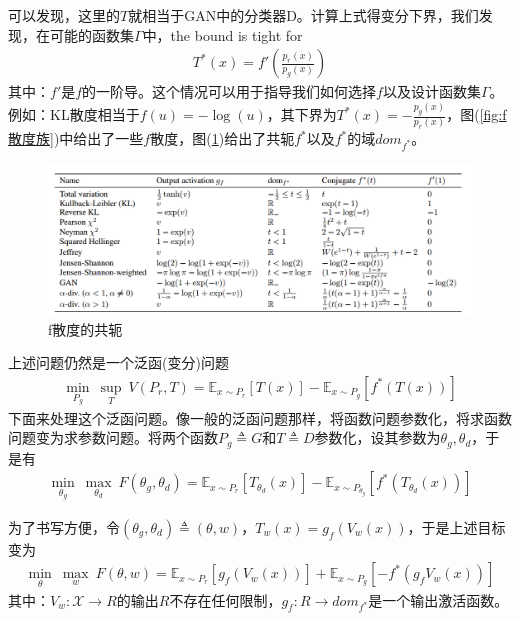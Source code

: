             \par
            可以发现，这里的$T$就相当于GAN中的分类器D。计算上式得变分下界，我们发现，在可能的函数集$\Gamma$中，the bound is tight for
            \begin{align*}
            T^*(x) = f' \left( \frac{p_r(x)}{p_g(x)} \right)
            \end{align*}
            其中：$f'$是$f$的一阶导。这个情况可以用于指导我们如何选择$f$以及设计函数集$\Gamma$。例如：KL散度相当于$f(u) = -\log (u)$，其下界为$T^*(x) = -\frac{p_g(x)}{p_r(x)}$，图(\ref{fig:f散度族})中给出了一些$f$散度，图(\ref{fig:f散度的共轭})给出了共轭$f^*$以及$f^*$的域$dom_{f^*}$。
                \begin{figure}[H]
                \centering
                \includegraphics[width=12cm]{images/fsandu.jpg}
                \caption{f散度的共轭}
                \label{fig:f散度的共轭}
                \end{figure}
            \par
            上述问题仍然是一个泛函(变分)问题
            \begin{align*}
            \min_{P_g} \ \sup_{T}\ V(P_r,T) = \mathbb{E}_{x\sim P_r}[T(x)] - \mathbb{E}_{x\sim P_g}[f^*(T(x))]
            \end{align*}
            下面来处理这个泛函问题。像一般的泛函问题那样，将函数问题参数化，将求函数问题变为求参数问题。将两个函数$P_g \triangleq G $和$T\triangleq D$参数化，设其参数为$\theta_g,\theta_d$，于是有
            \begin{align*}
            \min_{\theta_g} \ \max_{\theta_d}\ F(\theta_g,\theta_d) = \mathbb{E}_{x\sim P_r}[T_{\theta_d}(x)] - \mathbb{E}_{x\sim P_{\theta_g}}[f^*(T_{\theta_d}(x))]
            \end{align*}
            \par
            为了书写方便，令$(\theta_g,\theta_d) \triangleq (\theta,w)$，$T_w(x)  = g_f(V_w(x))$，于是上述目标变为
            \begin{align*}
            \min_\theta \ \max_w \ F(\theta,w) = \mathbb{E}_{x\sim P_r}[g_f(V_w(x))] + \mathbb{E}_{x\sim P_g}[-f^*(g_fV_w(x))]
            \end{align*}
            其中：$V_w:\mathcal{X}\to R$的输出$R$不存在任何限制，$g_f:R\to dom_{f^*}$是一个输出激活函数。
